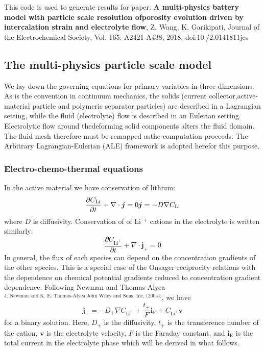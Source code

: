 This code is used to generate results for paper\-: {\bfseries A multi-\/physics battery model with particle scale resolution ofporosity evolution driven by intercalation strain and electrolyte flow}, Z. Wang, K. Garikipati, Journal of the Electrochemical Society, Vol. 165\-: A2421-\/\-A438, 2018, doi\-:10./2.0141811jes  \hypertarget{battery_particle_section1}{}\subsection{The multi-\/physics particle scale model}\label{battery_particle_section1}
We lay down the governing equations for primary variables in three dimensions. As is the convention in continuum mechanics, the solids (current collector,active-\/material particle and polymeric separator particles) are described in a Lagrangian setting, while the fluid (electrolyte) flow is described in an Eulerian setting. Electrolytic flow around thedeforming solid components alters the fluid domain. The fluid mesh therefore must be remapped asthe computation proceeds. The Arbitrary Lagrangian-\/\-Eulerian (A\-L\-E) framework is adopted herefor this purpose. \hypertarget{battery_particle_subsub1}{}\subsubsection{Electro-\/chemo-\/thermal equations}\label{battery_particle_subsub1}
In the active material we have conservation of lithium\-: \[ \frac{\partial C_\text{Li}}{\partial t}+\nabla\cdot\boldsymbol{j}=0\\ \boldsymbol{j}=-D\nabla C_\text{Li} \] where $D$ is diffusivity. Conservation of of Li $^+$ cations in the electrolyte is written similarly\-: \[ \frac{\partial C_{\text{Li}^+}}{\partial t}+\nabla\cdot\boldsymbol{j}_+=0 \] In general, the flux of each species can depend on the concentration gradients of the other species. This is a special case of the Onsager reciprocity relations with the dependence on chemical potential gradients reduced to concentration gradient dependence. Following Newman and Thomas-\/\-Alyea $^{\text{J. Newman and K. E. Thomas-Alyea,John Wiley and Sons, Inc, (2004).}}$, we have \[ \boldsymbol{j}_+=-D_{+}\nabla C_{\text{Li}^+} +\frac{t_+}{F}\boldsymbol{i}_\text{E}+C_{\text{Li}^+}\boldsymbol{v} \] for a binary solution. Here, $D_{+}$ is the diffusivity, $t_+$ is the transference number of the cation, $\boldsymbol{v}$ is the electrolyte velocity, $F$ is the Faraday constant, and $\boldsymbol{i}_\text{E}$ is the total current in the electrolyte phase which will be derived in what follows.


